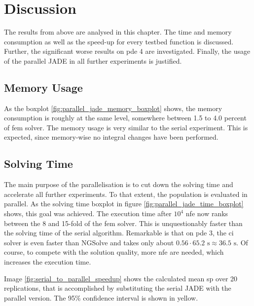 \documentclass[./\jobname.tex]{subfiles}
\begin{document}
\section{Discussion}

The results from above are analysed in this chapter. The time and memory consumption as well as the speed-up for every testbed function is discussed. Further, the significant worse results on \gls{pde} 4 are investigated. Finally, the usage of the parallel JADE in all further experiments is justified. 

\subsection{Memory Usage}
As the boxplot \ref{fig:parallel_jade_memory_boxplot} shows, the memory consumption is roughly at the same level, somewhere between 1.5 to 4.0 percent of \gls{fem} solver. The memory usage is very similar to the serial experiment. This is expected, since memory-wise no integral changes have been performed.  

\subsection{Solving Time}
The main purpose of the parallelisation is to cut down the solving time and accelerate all further experiments. To that extent, the population is evaluated in parallel. As the solving time boxplot in figure \ref{fig:parallel_jade_time_boxplot} shows, this goal was achieved. The execution time after $10^4$ \gls{nfe} now ranks between the 8 and 15-fold of the \gls{fem} solver. This is unquestionably faster than the solving time of the serial algorithm. Remarkable is that on \gls{pde} 3, the \gls{ci} solver is even faster than NGSolve and takes only about $0.56 \cdot 65.2 \text{ s} \approx 36.5 \text{ s}$. Of course, to compete with the solution quality, more \gls{nfe} are needed, which increases the execution time. 

Image \ref{fig:serial_to_parallel_speedup} shows the calculated mean \gls{sp} over 20 replications, that is accomplished by substituting the serial JADE with the parallel version. The 95\% confidence interval is shown in yellow. 
\end{document}
